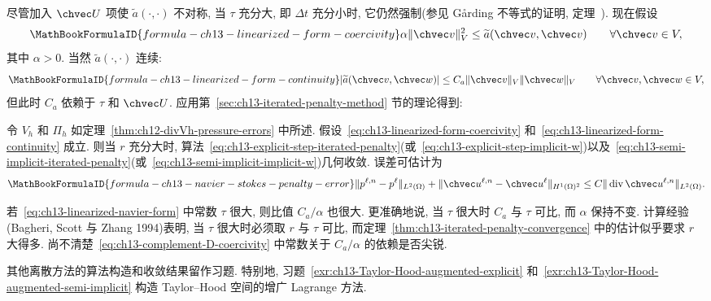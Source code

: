 尽管加入 $\chvec U$ 项使 $\widetilde a(\cdot,\cdot)$ 不对称, 当 $\tau$ 充分大, 即 $\Delta t$ 充分小时, 它仍然强制(参见 Gårding 不等式的证明, 定理~). 现在假设
\begin{equation}
\MathBookFormulaID{formula-ch13-linearized-form-coercivity}
\label{eq:ch13-linearized-form-coercivity}
\alpha\|\chvec v\|_V^2
\leq\widetilde a(\chvec v,\chvec v)
\qquad\forall\chvec v\in V,
\end{equation}
其中 $\alpha>0$. 当然 $\widetilde a(\cdot,\cdot)$ 连续:
\begin{equation}
\MathBookFormulaID{formula-ch13-linearized-form-continuity}
\label{eq:ch13-linearized-form-continuity}
|\widetilde a(\chvec v,\chvec w)|
\leq C_a\|\chvec v\|_V\|\chvec w\|_V
\qquad\forall\chvec v,\chvec w\in V,
\end{equation}
但此时 $C_a$ 依赖于 $\tau$ 和 $\chvec U$. 应用第~\ref{sec:ch13-iterated-penalty-method} 节的理论得到:

\begin{Theorem}
\label{thm:ch13-navier-stokes-penalty-convergence}
令 $V_h$ 和 $\Pi_h$ 如定理~\ref{thm:ch12-divVh-pressure-errors} 中所述. 假设~\eqref{eq:ch13-linearized-form-coercivity} 和~\eqref{eq:ch13-linearized-form-continuity} 成立. 则当 $r$ 充分大时, 算法~\eqref{eq:ch13-explicit-step-iterated-penalty}(或~\eqref{eq:ch13-explicit-step-implicit-w})以及~\eqref{eq:ch13-semi-implicit-iterated-penalty}(或~\eqref{eq:ch13-semi-implicit-implicit-w})几何收敛. 误差可估计为
\[
\MathBookFormulaID{formula-ch13-navier-stokes-penalty-error}
\|p^{\ell,n}-p^\ell\|_{L^2(\Omega)}
+\|\chvec u^{\ell,n}-\chvec u^\ell\|_{H^1(\Omega)^2}
\leq C\|\operatorname{div}\chvec u^{\ell,n}\|_{L^2(\Omega)}.
\]
\end{Theorem}

\begin{Remark}
\label{rem:ch13-large-tau-penalty-parameter}
若~\eqref{eq:ch13-linearized-navier-form} 中常数 $\tau$ 很大, 则比值 $C_a/\alpha$ 也很大. 更准确地说, 当 $\tau$ 很大时 $C_a$ 与 $\tau$ 可比, 而 $\alpha$ 保持不变. 计算经验(Bagheri, Scott 与 Zhang 1994)表明, 当 $\tau$ 很大时必须取 $r$ 与 $\tau$ 可比, 而定理~\ref{thm:ch13-iterated-penalty-convergence} 中的估计似乎要求 $r$ 大得多. 尚不清楚~\eqref{eq:ch13-complement-D-coercivity} 中常数关于 $C_a/\alpha$ 的依赖是否尖锐.
\end{Remark}

其他离散方法的算法构造和收敛结果留作习题. 特别地, 习题~\ref{exr:ch13-Taylor-Hood-augmented-explicit} 和~\ref{exr:ch13-Taylor-Hood-augmented-semi-implicit} 构造 Taylor--Hood 空间的增广 Lagrange 方法.

